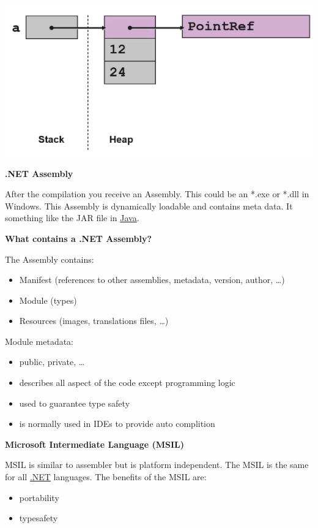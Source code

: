 \documentclass[11pt,twoside,landscape]{article}
\begin{document}
\begin{multicols}{3}
\begin{center}
\includegraphics[width=.9\linewidth]{img/ref_type_stack_heap.png}
\label{org6141b25}
\end{center}

\textbf{.NET Assembly}

After the compilation you receive an Assembly.
This could be an *.exe or *.dll in Windows.
This Assembly is dynamically loadable and contains meta data.
It something like the JAR file in \href{../../../roam/20201116150053-java.org}{Java}.

\textbf{What contains a .NET Assembly?}

The Assembly contains:
\begin{itemize}
\item Manifest (references to other assemblies, metadata, version, author, \ldots{})
\item Module (types)
\item Resources  (images, translations files, \ldots{})
\end{itemize}


Module metadata:
\begin{itemize}
\item public, private, \ldots{}
\item describes all aspect of the code except programming logic
\item used to guarantee type safety
\item is normally used in IDEs to provide auto complition
\end{itemize}


\textbf{Microsoft Intermediate Language (MSIL)}

MSIL is similar to assembler but is platform independent.
The MSIL is the same for all \href{../../../roam/20211003114703-net.org}{.NET} languages.
The benefits of the MSIL are:
\begin{itemize}
\item portability
\item typesafety
\end{itemize}


\end{multicols}
\end{document}
